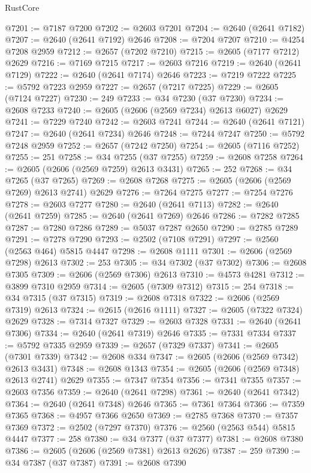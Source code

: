 \begin{lexlean}{RustCore}
\begin{coremodule}
@7201 := @7187 @7200
@7202 := @2603 @7201
@7204 := @2640 (@2641 @7182)
@7207 := @2640 (@2641 @7192) @2646
@7208 := @7204 @7207
@7210 := @4254 @7208 @2959
@7212 := @2657 (@7202 @7210)
@7215 := @2605 (@7177 @7212) @2629
@7216 := @7169 @7215
@7217 := @2603 @7216
@7219 := @2640 (@2641 @7129)
@7222 := @2640 (@2641 @7174) @2646
@7223 := @7219 @7222
@7225 := @5792 @7223 @2959
@7227 := @2657 (@7217 @7225)
@7229 := @2605 (@7124 @7227)
@7230 := 249
@7233 := @34 @7230 (@37 @7230)
@7234 := @2608 @7233
@7240 := @2605 (@2606 (@2569 @7234) @2613 @6027) @2629
@7241 := @7229 @7240
@7242 := @2603 @7241
@7244 := @2640 (@2641 @7121)
@7247 := @2640 (@2641 @7234) @2646
@7248 := @7244 @7247
@7250 := @5792 @7248 @2959
@7252 := @2657 (@7242 @7250)
@7254 := @2605 (@7116 @7252)
@7255 := 251
@7258 := @34 @7255 (@37 @7255)
@7259 := @2608 @7258
@7264 := @2605 (@2606 (@2569 @7259) @2613 @3431)
@7265 := 252
@7268 := @34 @7265 (@37 @7265)
@7269 := @2608 @7268
@7275 := @2605 (@2606 (@2569 @7269) @2613 @2741) @2629
@7276 := @7264 @7275
@7277 := @7254 @7276
@7278 := @2603 @7277
@7280 := @2640 (@2641 @7113)
@7282 := @2640 (@2641 @7259)
@7285 := @2640 (@2641 @7269) @2646
@7286 := @7282 @7285
@7287 := @7280 @7286
@7289 := @5037 @7287 @2650
@7290 := @2785 @7289
@7291 := @7278 @7290
@7293 := @2502 (@7108 @7291)
@7297 := @2560 (@2563 @464) @5815 @4447
@7298 := @2608 @1111
@7301 := @2606 (@2569 @7298) @2613
@7302 := 253
@7305 := @34 @7302 (@37 @7302)
@7306 := @2608 @7305
@7309 := @2606 (@2569 @7306) @2613
@7310 := @4573 @4281
@7312 := @3899 @7310 @2959
@7314 := @2605 (@7309 @7312)
@7315 := 254
@7318 := @34 @7315 (@37 @7315)
@7319 := @2608 @7318
@7322 := @2606 (@2569 @7319) @2613
@7324 := @2615 (@2616 @1111)
@7327 := @2605 (@7322 @7324) @2629
@7328 := @7314 @7327
@7329 := @2603 @7328
@7331 := @2640 (@2641 @7306)
@7334 := @2640 (@2641 @7319) @2646
@7335 := @7331 @7334
@7337 := @5792 @7335 @2959
@7339 := @2657 (@7329 @7337)
@7341 := @2605 (@7301 @7339)
@7342 := @2608 @334
@7347 := @2605 (@2606 (@2569 @7342) @2613 @3431)
@7348 := @2608 @1343
@7354 := @2605 (@2606 (@2569 @7348) @2613 @2741) @2629
@7355 := @7347 @7354
@7356 := @7341 @7355
@7357 := @2603 @7356
@7359 := @2640 (@2641 @7298)
@7361 := @2640 (@2641 @7342)
@7364 := @2640 (@2641 @7348) @2646
@7365 := @7361 @7364
@7366 := @7359 @7365
@7368 := @4957 @7366 @2650
@7369 := @2785 @7368
@7370 := @7357 @7369
@7372 := @2502 (@7297 @7370)
@7376 := @2560 (@2563 @544) @5815 @4447
@7377 := 258
@7380 := @34 @7377 (@37 @7377)
@7381 := @2608 @7380
@7386 := @2605 (@2606 (@2569 @7381) @2613 @2626)
@7387 := 259
@7390 := @34 @7387 (@37 @7387)
@7391 := @2608 @7390

\end{coremodule}
\end{lexlean}
